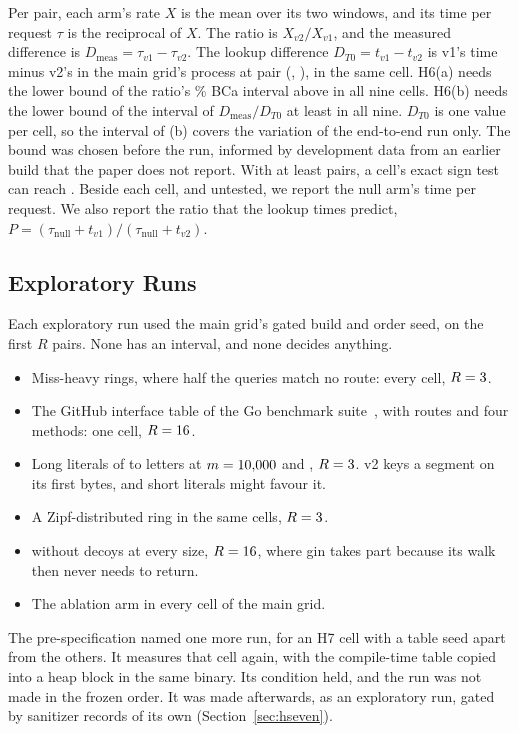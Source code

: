 Per pair, each arm's rate $X$ is the mean over its two windows, and its time per request $\tau$ is
the reciprocal of $X$. The ratio is $X_{v2}/X_{v1}$, and the measured difference is
$D_{\mathrm{meas}}=\tau_{v1}-\tau_{v2}$. The lookup difference $D_{T0}=t_{v1}-t_{v2}$ is v1's time
minus v2's in the main grid's process at pair (\HSixTableSeed, \HSixRingSeed), in the same cell.
H6(a) needs the lower bound of the ratio's \Level\% BCa interval above \SupMargin{} in all nine cells.
H6(b) needs the lower bound of the interval of $D_{\mathrm{meas}}/D_{T0}$ at least \CarryBound{} in
all nine. $D_{T0}$ is one value per cell, so the interval of (b) covers the variation of the
end-to-end run only. The bound \CarryBound{} was chosen before the run, informed by development data
from an earlier build that the paper does not report. With at least \HSixMinPairs{}
pairs, a cell's exact sign test can reach \HSixSignMinP. Beside each cell, and untested, we report
the null arm's time per request. We also report the ratio that the lookup times predict,
$P=(\tau_{\mathrm{null}}+t_{v1})/(\tau_{\mathrm{null}}+t_{v2})$.

\subsection{Exploratory Runs}\label{sec:explore}

Each exploratory run used the main grid's gated build and order seed, on the first $R$ pairs. None
has an interval, and none decides anything.
\begin{itemize}
\item Miss-heavy rings, where half the queries match no route: every cell, $R=3$.
\item The GitHub interface table of the Go benchmark suite~\cite{schmidt2020gohttproutingbench}, with
\GithubRoutes{} routes and four methods: one cell, $R=16$.
\item Long literals of \LongWordMin{} to \LongWordMax{} letters at $m=10{,}000$ and
\SizeHundredThousand, $R=3$. v2 keys a segment on its first \KeyBytes{} bytes, and short
literals might favour it.
\item A Zipf-distributed ring in the same cells, $R=3$.
\item {} without decoys at every size, $R=16$, where gin takes part
because its walk then never needs to return.
\item The ablation arm in every cell of the main grid.
\end{itemize}
The pre-specification named one more run, for an H7 cell with a table seed apart from the others.
It measures that cell again, with the compile-time table copied into a heap block in the same
binary. Its condition held, and the run was not made in the frozen order. It was made afterwards,
as an exploratory run, gated by sanitizer records of its own (Section~\ref{sec:hseven}).

